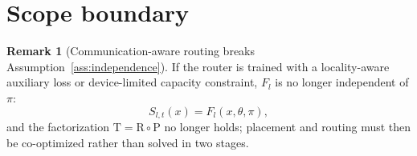 \documentclass[11pt]{article}
\theoremstyle{definition}
\newtheorem{remark}{Remark}
\newcommand{\Route}{\mathrm{R}}
\newcommand{\Place}{\mathrm{P}}
\newcommand{\Traffic}{\mathrm{T}}
\begin{document}
\section{Scope boundary}

\begin{remark}[Communication-aware routing breaks Assumption~\ref{ass:independence}]
If the router is trained with a locality-aware auxiliary loss or device-limited
capacity constraint, $F_l$ is no longer independent of $\pi$:
\[
  S_{l,t}(x) = F_l(x,\theta,\pi),
\]
and the factorization $\Traffic=\Route\circ\Place$ no longer holds; placement
and routing must then be co-optimized rather than solved in two stages.
\end{remark}
\end{document}
